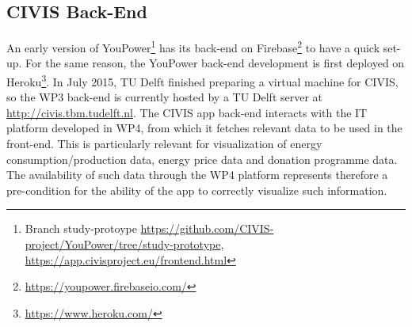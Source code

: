 \subsection{CIVIS Back-End}

An early version of YouPower\footnote{Branch study-protoype \url{https://github.com/CIVIS-project/YouPower/tree/study-prototype}, 
\url{https://app.civisproject.eu/frontend.html}} has its back-end on Firebase\footnote{\url{https://youpower.firebaseio.com/}} to have a quick set-up.  
For the same reason, the YouPower back-end development is first deployed on Heroku\footnote{\url{https://www.heroku.com/}}. In July 2015, TU Delft finished preparing a virtual machine for CIVIS, so the WP3 back-end is currently hosted by a TU Delft server at {\footnotesize\url{http://civis.tbm.tudelft.nl}}. The CIVIS app back-end interacts with the IT platform developed in WP4, from which it fetches relevant data to be used in the front-end. This is particularly relevant for visualization of energy consumption/production data, energy price data and donation programme data. The availability of such data through the WP4 platform represents therefore a pre-condition for the ability of the app to correctly visualize such information.

